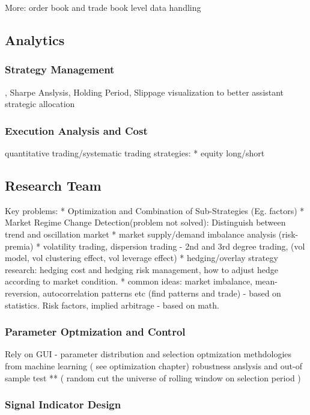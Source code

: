 \documentclass[11pt, openany]{book}              %
\begin{document}
More: order book and trade book level data handling

\subsection{Analytics}

\subsubsection{ Strategy Management }, Sharpe Anslysis, Holding Period, Slippage visualization to better assistant strategic allocation

\subsubsection{Execution Analysis and Cost}

quantitative trading/systematic trading strategies:
* equity long/short

\subsection{Research Team}
Key problems:
* Optimization and Combination of Sub-Strategies (Eg. factors)
* Market Regime Change Detection(problem not solved): Distinguish between trend and oscillation market
* market supply/demand imbalance analysis (risk-premia) 
* volatility trading, dispersion trading - 2nd and 3rd degree trading, (vol model, vol clustering effect, vol leverage effect)
* hedging/overlay strategy research: hedging cost and hedging risk management, how to adjust hedge according to market condition.
* common ideas: market imbalance, mean-reversion, autocorrelation patterns etc (find patterns and trade) - based on statistics.  Risk factors, implied arbitrage - based on math. 

\subsubsection{Parameter Optmization and Control}

Rely on GUI - parameter distribution and selection
optmization methdologies from machine learning ( see optimization chapter)
robustness anslysis and out-of sample test ** ( random cut the universe of rolling window on selection period )

\subsubsection{Signal Indicator Design}
\end{document}
